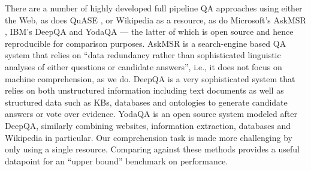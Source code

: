 \documentclass[11pt,a4paper]{article}
\begin{document}
There are a number of highly developed full pipeline QA approaches using either the Web, as does QuASE \cite{sun2015open}, or Wikipedia as a resource, as do Microsoft's AskMSR \cite{brill2002askmsr},
IBM's DeepQA \cite{ferrucci2010building} and YodaQA \cite{baudivs2015yodaqa,baudivs2015modeling} --- the latter of which is open source and hence reproducible for comparison purposes.
AskMSR is a search-engine based QA system that relies on ``data redundancy rather than sophisticated linguistic analyses of either questions or candidate answers'', i.e., it does not focus on machine comprehension, as we do. DeepQA is a very sophisticated system that relies on both unstructured information including text documents as well as structured data such as KBs, databases and ontologies to generate candidate answers or vote over evidence. YodaQA is an open source system modeled after DeepQA, similarly combining websites, information extraction, databases and Wikipedia in particular. Our comprehension task is made more challenging by only using a single resource. Comparing against these methods provides a useful datapoint for an ``upper bound'' benchmark on performance.





\end{document}
